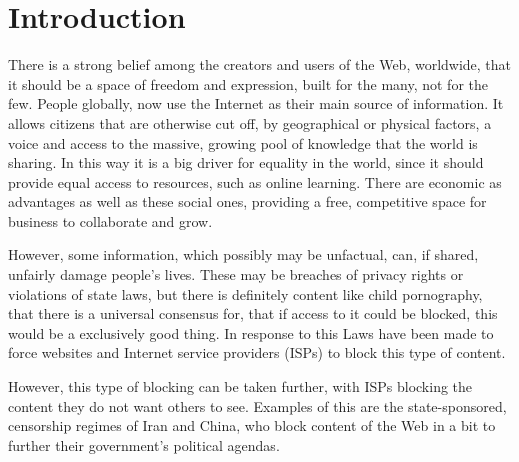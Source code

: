 \documentclass[ %
                    author={Samuel Russell},
                supervisor={Prof. Bogdan Warinschi},
                    degree={MEng},
                     title={Innocuous Ciphertexts},
                  subtitle={The DE-CENSOR Scheme},
                      type={research},
                      year={2018} ]{dissertation}
\begin{document}
%

\mainmatter


\chapter{Introduction}
\label{chap:intro}

There is a strong belief among the creators and users of the Web, worldwide, that it should be a space of freedom and expression, built for the many, not for the few.
People globally, now use the Internet as their main source of information.
It allows citizens that are otherwise cut off, by geographical or physical factors, a voice and access to the massive, growing pool of knowledge that the world is sharing.
In this way it is a big driver for equality in the world, since it should provide equal access to resources, such as online learning.
There are economic as advantages as well as these social ones, providing a free, competitive space for business to collaborate and grow.

However, some information, which possibly may be unfactual, can, if shared, unfairly damage people's lives.
These may be breaches of privacy rights or violations of state laws, but there is definitely content like child pornography, that there is a universal consensus for, that if access to it could be blocked, this would be a exclusively good thing.
In response to this Laws have been made to force websites and Internet service providers (ISPs) to block this type of content.

However, this type of blocking can be taken further, with ISPs blocking the content they do not want others to see. Examples of this are the state-sponsored, censorship regimes of Iran and China, who block content of the Web in a bit to further their government's political agendas.
\end{document}
